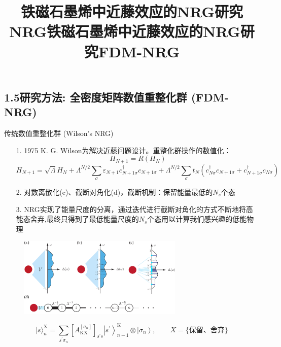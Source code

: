 \documentclass[9pt,t]{beamer} %
\begin{document}
\subsection{1.5研究方法: 全密度矩阵数值重整化群 (FDM-NRG)}
\title{铁磁石墨烯中近藤效应的NRG研究\qquad \qquad \qquad \qquad NRG}
\begin{frame}{传统数值重整化群 (Wilson's NRG)}
\begin{itemize}
\setlength\itemsep{0.4em}
\item[1.] 1975 K. G. Wilson为解决近藤问题设计。重整化群操作的数值化：
\[
H_{N+1}=R\left(H_{N}\right)
\]
\[
 H_{N+1}= \sqrt{\Lambda} H_{N}+\Lambda^{N / 2} \sum_{\sigma} \varepsilon_{N+1} c_{N+1 \sigma}^{\dagger} c_{N+1 \sigma} +\Lambda^{N / 2} \sum_{\sigma} t_{N}\left(c_{N \sigma}^{\dagger} c_{N+1 \sigma}+c_{N+1 \sigma}^{\dagger} c_{N \sigma}\right)
\]
\item[2.] 对数离散化(c)、截断对角化(d)，截断机制：保留能量最低的$N_{s}$个态
\item[3.] NRG实现了能量尺度的分离，通过迭代进行截断对角化的方式不断地将高能态舍弃,最终只得到了最低能量尺度的$N_{s}$个态用以计算我们感兴趣的低能物理
\end{itemize}
\begin{figure}
\includegraphics[width=0.7\textwidth,height=0.29\textwidth]{NRGmapping.png}
\end{figure}
\[
|s\rangle_{n}^{\mathrm{X}}=\sum_{s^{\prime} \sigma_{n}}\left[A_{\mathrm{KX}}^{\left[\sigma_{n}\right]}\right]_{s^{\prime} s}\left|s^{\prime}\right\rangle_{n-1}^{\mathrm{K}} \otimes\left|\sigma_{n}\right\rangle , \qquad X=\{\text{保留、舍弃}\}
\]

\end{frame}
\title{铁磁石墨烯中近藤效应的NRG研究\qquad \qquad \qquad \qquad FDM-NRG}
\end{document}
